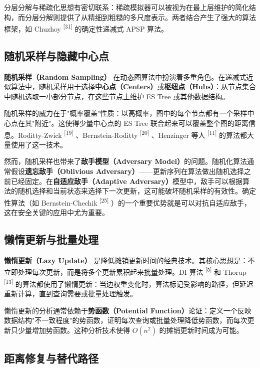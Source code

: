 \documentclass[12pt,a4paper]{ctexart}
\begin{document}
分层分解与稀疏化思想有密切联系：稀疏模拟器可以被视为在最上层维护的简化结构，而分层分解则提供了从精细到粗糙的多尺度表示。两者结合产生了强大的算法框架，如 Chuzhoy \textsuperscript{[31]}  的确定性递减式 APSP 算法。

\subsection{随机采样与隐藏中心点}

\textbf{随机采样（Random Sampling）} 在动态图算法中扮演着多重角色。在递减式近似算法中，随机采样用于选择\textbf{中心点（Centers）}或\textbf{枢纽点（Hubs）}：从节点集合中随机选取一小部分节点，在这些节点上维护 ES Tree 或其他数据结构。

随机采样的威力在于"概率覆盖"性质：以高概率，图中的每个节点都有一个采样中心点在其"附近"。这使得少量中心点的 ES Tree 联合起来可以覆盖整个图的距离信息。Roditty-Zwick \textsuperscript{[19]} 、Bernstein-Roditty \textsuperscript{[20]} 、Henzinger 等人 \textsuperscript{[11]}  的算法都大量使用了这一技术。

然而，随机采样也带来了\textbf{敌手模型（Adversary Model）}的问题。随机化算法通常假设\textbf{遗忘敌手（Oblivious Adversary）}——更新序列在算法做出随机选择之前已经固定。在\textbf{自适应敌手（Adaptive Adversary）}模型中，敌手可以根据算法的随机选择和当前状态来选择下一次更新，这可能破坏随机采样的有效性。确定性算法（如 Bernstein-Chechik \textsuperscript{[25]} ）的一个重要优势就是可以对抗自适应敌手，这在安全关键的应用中尤为重要。

\subsection{懒惰更新与批量处理}

\textbf{懒惰更新（Lazy Update）} 是降低摊销更新时间的经典技术。其核心思想是：不立即处理每次更新，而是将多个更新累积起来批量处理。DI 算法 \textsuperscript{[5]}  和 Thorup \textsuperscript{[13]}  的算法都使用了懒惰更新：当边权重变化时，算法标记受影响的路径，但延迟重新计算，直到查询需要或批量处理触发。

懒惰更新的分析通常依赖于\textbf{势函数（Potential Function）}论证：定义一个反映数据结构"不一致程度"的势函数，证明每次查询或批量处理降低势函数，而每次更新只少量增加势函数。这种分析技术使得 $O(n^2)$ 的摊销更新时间成为可能。

\subsection{距离修复与替代路径}
\end{document}
